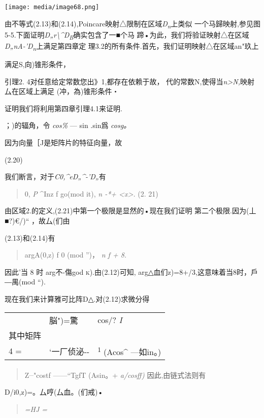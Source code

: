 \documentclass{article}
\begin{document}
\texttt{[image: media/image68.png]}

由不等式(2.13)和(2.14),Poincare映射△限制在区域\emph{D\textsubscript{n}}上类似
一个马歸映射,参见图5-5.下面证明\emph{D„r\textbackslash{}\^{}D\textsubscript{B}}确实包含了一■个马
蹄•为此，我们将验证映射△在区域\emph{D„nA-'D\textsubscript{n}}上满足第四章定
理3.2的所有条件.首先，我们证明映射△在区域an"玖上

满足S,向)锥形条件，

引理2. 4对任意给定常数您出》1,都存在依赖于故，
代的常数N,使得当\emph{n\textgreater{}N,}映射厶在区域上满足
(冲，為)锥形条件・

证明我们将利用第四章引理4.1来证明.

；)的辐角，令 \emph{cos\%} --- sin .sin爲 \emph{cosg。}

因为向量［J是矩阵片的特征向量，故

(2.20)

我们断言，对于\emph{C0,\^{}eD„\^{}-'D„}有

\begin{quote}
0, \emph{P} \^{}Inz f go(mod it), \emph{n -*+
\textless{}x\textgreater{}.} (2. 21)
\end{quote}

由区域2.的定义,(2.21)中第一个极限是显然的•现在我们证明
第二个极限.因为(丄■?)€/)`` ，故厶(们由

(2.13)和(2.14)有

\begin{quote}
argA(0,z) f 0 (mod '')， \emph{n f + 8.}
\end{quote}

因此'当 8 时 arg不-傷god \textsc{k)}.由(2.12)可知,
arg△血们z)=8+/3,这意味着当8时，戶―禺(mod ``).

现在我们来计算雅可比阵D△.对(2.12)求微分得

\begin{longtable}[]{@{}lll@{}}
\toprule
\endhead
& 脳")=驚 & cos/? \emph{I}\tabularnewline
其中矩阵 & &\tabularnewline
4 = & `一厂侦泌-\/- & \textsuperscript{1} (Acos\^{}
---如in。)\tabularnewline
\bottomrule
\end{longtable}

\begin{quote}
Z\textsuperscript{\_}"costf ------``TgfT (Asin。+ \emph{a/cosff)}
因此,由链式法则有
\end{quote}

D/i0,z)=。厶哼(厶血。(们戒)•

\begin{quote}
\emph{=HJ =}
\end{quote}
\end{document}
